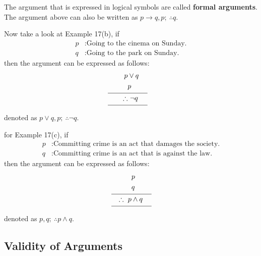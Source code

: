 \documentclass{report}
\begin{document}
The argument that is expressed in logical symbols are called \textbf{formal
    arguments}. The argument above can also be written as $p \rightarrow q, p;\
    \therefore q$.

Now take a look at Example 17(b), if
\begin{align*}
    p & : \text{Going to the cinema on Sunday.} \\
    q & : \text{Going to the park on Sunday.}
\end{align*}
then the argument can be expressed as follows:
\begin{align*}
    p          & \lor q                       \\
               & p                            \\[-8pt]
               & \mathclap{\rule{2cm}{0.4pt}} \\[-5pt]
    \therefore & \ \neg q                     \\[-8pt]
               & \mathclap{\rule{2cm}{0.4pt}}
\end{align*}
denoted as $p \lor q, p;\ \therefore \neg q$.

for Example 17(c), if
\begin{align*}
    p & : \text{Committing crime is an act that damages the society.} \\
    q & : \text{Committing crime is an act that is against the law.}
\end{align*}
then the argument can be expressed as follows:
\begin{align*}
                   & p                            \\
                   & q                            \\[-8pt]
                   & \mathclap{\rule{2cm}{0.4pt}} \\[-5pt]
    \therefore \ p & \land q                      \\[-8pt]
                   & \mathclap{\rule{2cm}{0.4pt}}
\end{align*}
denoted as $p, q;\ \therefore p \land q$.

\subsection*{Validity of Arguments}
\end{document}
